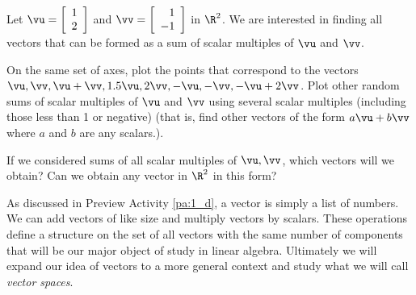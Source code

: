 \begin{pa}
\begin{comment}
This again gives us a line through the origin and the point $(1,1,1)$, but the line is in three-dimensional space.
\end{comment}
\ea

\item Let $\vu=\left[ \begin{array}{c} 1\\ 2 \end{array} \right]$ and $\vv=\left[ \begin{array}{r} 1\\ -1 \end{array} \right]$ in $\R^2$. We are interested in finding all vectors that can be formed as a sum of scalar multiples of $\vu$ and $\vv$.
\ba
\item On the same set of axes, plot the points that correspond to the vectors $\vu, \vv, \vu+\vv, 1.5\vu, 2\vv, -\vu, -\vv, -\vu+2\vv$.  Plot other random sums of scalar multiples of $\vu$ and $\vv$ using several scalar multiples (including those less than 1 or negative) (that is, find other vectors of the form $a\vu + b\vv$ where $a$ and $b$ are any scalars.).


\item If we considered sums of all scalar multiples of $\vu, \vv$, which vectors will we obtain? Can we obtain any vector in $\R^2$ in this form?



\ea


\ee


\end{pa}



As discussed in Preview Activity \ref{pa:1_d}, a vector is simply a list of numbers. We can add vectors of like size and multiply vectors by scalars. These operations define a structure on the set of all vectors with the same number of components that will be our major object of study in linear algebra. Ultimately we will expand our idea of vectors to a more general context and study what we will call \emph{vector spaces}.

